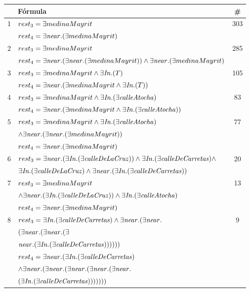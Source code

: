 \label{formulas-plurales}
\begin{table}[h]
\begin{center}
\begin{tabular}{|l|l|c|}
\hline
&F\'ormula			      &  \# \\ \hline \hline

1&$rest_3 = \exists medinaMayrit$ &303\\
 &$rest_4 = \exists \mathit{near}.(\exists medinaMayrit)$& \\ \hline

2&$rest_3 = \exists medinaMayrit$ & 285\\  
 &$rest_4 =  \exists \mathit{near}. (\exists \mathit{near}.(\exists medinaMayrit)) \land \exists \mathit{near}.(\exists medinaMayrit)$& \\ \hline

3&$rest_3 =\exists medinaMayrit \land \exists \mathit{In}.(T)$ & 105\\ 
 &$rest_4 =\exists \mathit{near}.(\exists medinaMayrit \land \exists \mathit{In}.(T))$& \\ \hline

4&$rest_3 =\exists medinaMayrit \land \exists \mathit{In}.(\exists \mathit{calleAtocha})$ &83 \\ 
 &$rest_4 =\exists \mathit{near}.(\exists medinaMayrit  \land \exists \mathit{In}.(\exists \mathit{calleAtocha}))$& \\ \hline

5&$rest_3 =\exists medinaMayrit  \land \exists \mathit{In}.(\exists \mathit{calleAtocha})$&77 \\ 
 &$\land \exists \mathit{near}.(\exists \mathit{near}.(\exists medinaMayrit))$& \\
&$rest_4 = \exists \mathit{near}.(\exists medinaMayrit)$& \\ \hline

6&$rest_3 =\exists \mathit{near}.(\exists \mathit{In}.(\exists \mathit{calleDeLaCruz}))  \land \exists \mathit{In}.(\exists \mathit{calleDeCarretas}) \land $ & 20\\
&$\exists \mathit{In}.(\exists \mathit{calleDeLaCruz})  \land \exists \mathit{near}.(\exists \mathit{In}.(\exists \mathit{calleDeCarretas}))$& \\ \hline

7&$rest_3 =\exists medinaMayrit  $&13 \\ 
&$\land \exists \mathit{near}.(\exists \mathit{In}.(\exists \mathit{calleDeLaCruz}))  \land \exists \mathit{In}.(\exists \mathit{calleAtocha})$ & \\
&$rest_4 = \exists \mathit{near}.(\exists medinaMayrit)$&\\ \hline

8&$rest_3 =\exists \mathit{In}.(\exists \mathit{calleDeCarretas})  \land \exists \mathit{near}.(\exists \mathit{near}.$&9\\
&$(\exists \mathit{near}.(\exists \mathit{near}.(\exists$ &\\
&$\mathit{near}.(\exists \mathit{In}.(\exists \mathit{calleDeCarretas})))))) $&\\
&$rest_4 = \exists \mathit{near}.(\exists \mathit{In}.(\exists \mathit{calleDeCarretas})  $ & \\
&$\land \exists \mathit{near}.(\exists \mathit{near}.(\exists \mathit{near}.(\exists \mathit{near}.(\exists \mathit{near}.$&\\
&$(\exists \mathit{In}.(\exists \mathit{calleDeCarretas})))))))$&\\ \hline


\end{tabular}
\end{center}
\end{table}
